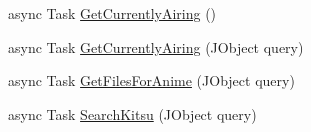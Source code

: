\begin{DoxyCompactItemize}
\item 
async Task \mbox{\hyperlink{class_little_weeb_library_1_1_services_1_1_info_api_web_socket_service_aec42147d67551cb17c458453ef40f3bc}{Get\+Currently\+Airing}} ()
\item 
async Task \mbox{\hyperlink{class_little_weeb_library_1_1_services_1_1_info_api_web_socket_service_a71d24528e1dd2c138abed9778e9cc761}{Get\+Currently\+Airing}} (J\+Object query)
\item 
async Task \mbox{\hyperlink{class_little_weeb_library_1_1_services_1_1_info_api_web_socket_service_a299be5b400f1368ab169599395a3e56d}{Get\+Files\+For\+Anime}} (J\+Object query)
\item 
async Task \mbox{\hyperlink{class_little_weeb_library_1_1_services_1_1_info_api_web_socket_service_af6678c62bfe074bc5ce399ff21641d6e}{Search\+Kitsu}} (J\+Object query)
\end{DoxyCompactItemize}
